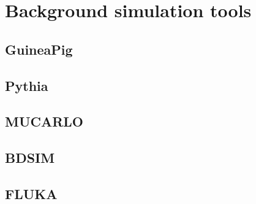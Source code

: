 \chapter{Background simulation tools}


\section{GuineaPig}

\section{Pythia}

\section{MUCARLO}

\section{BDSIM}

\section{FLUKA}